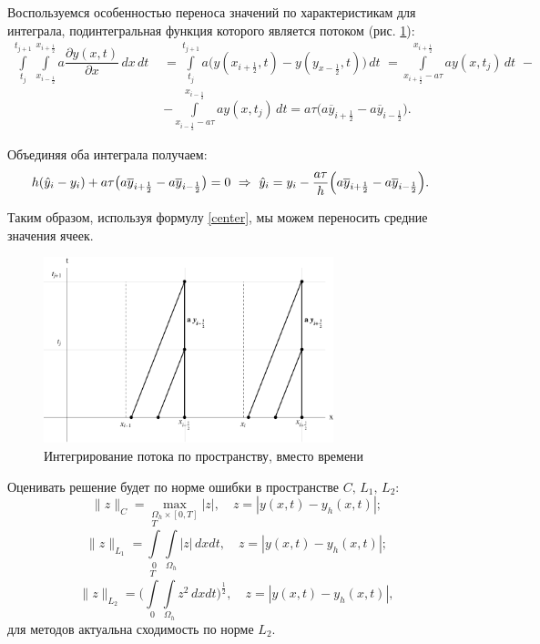 \documentclass[12pt,a4paper]{article}
\newcommand{\picref}[1]{рис. \ref{#1}}
\newcommand{\half}{\frac{1}{2}}
\begin{document}
    Воспользуемся особенностью переноса значений по характеристикам для интеграла, подинтегральная функция которого является потоком (\picref{fig:flow_visual}):
    \[
        \begin{split}
            \int \limits_{t_j}^{t_{j+1}} \int \limits_{x_{i-\half}}^{x_{i+\half}} a \dfrac{ \partial y(x,t) }{ \partial x } \, dx \, dt \,\, &= \int \limits_{t_j}^{t_{j+1}} a \bigl( y(x_{i+\half}, t) - y(y_{x-\half}, t) \bigr) \, dt \,\, =  \int \limits_{x_{i+\half}-a\tau}^{x_{i+\half}} a y(x, t_j) \, dt \,\, - \\
            &- \int \limits_{x_{i-\half}-a\tau}^{x_{i-\half}} a y(x, t_j) \, dt = a\tau\bigl( a \overline y_{i+\half} - a \overline y_{i-\half} \bigr).
        \end{split}
    \]

    Объединяя оба интеграла получаем:
    \begin{equation}
        \begin{split}
            h ( \hat y_i - y_i) &+ a\tau\bigl( a \overline y_{i+\half} - a \overline y_{i-\half} \bigr) = 0 \,\, \Rightarrow \,\, \hat y_i = y_i - \dfrac{ a\tau }{ h } \Bigl( a \overline y_{i+\half} - a \overline y_{i-\half} \Bigr).
        \end{split}
        \label{center}
    \end{equation}

    Таким образом, используя формулу \eqref{center}, мы можем переносить средние значения ячеек.

    \pagebreak

    \begin{figure}[h]
        \centering
        \includegraphics[width=0.75\textwidth]{flow_visual.pdf}
        \caption{Интегрирование потока по пространству, вместо времени}
        \label{fig:flow_visual}
    \end{figure}

    Оценивать решение будет по норме ошибки в пространстве $ C,\, L_1,\, L_2\colon $
    \[
        \|z\|_{C} = \max_{\Omega_h \times [0, T]} |z|, \quad z = |y(x,t)-y_h(x,t)|;
    \]
    \[
        \|z\|_{L_1} = \int\limits_{0}^{T}\int\limits_{\Omega_h} |z|\, dx dt, \quad z = |y(x,t)-y_h(x,t)|;
    \]
    \[
        \|z\|_{L_2} = \Biggl( \int\limits_{0}^{T}\int\limits_{\Omega_h} z^2\, dx dt \Biggr)^{\tfrac{1}{2}}, \quad z = |y(x,t)-y_h(x,t)|,
    \]
    \noindent для методов актуальна сходимость по норме $ L_2 $.
\end{document}
